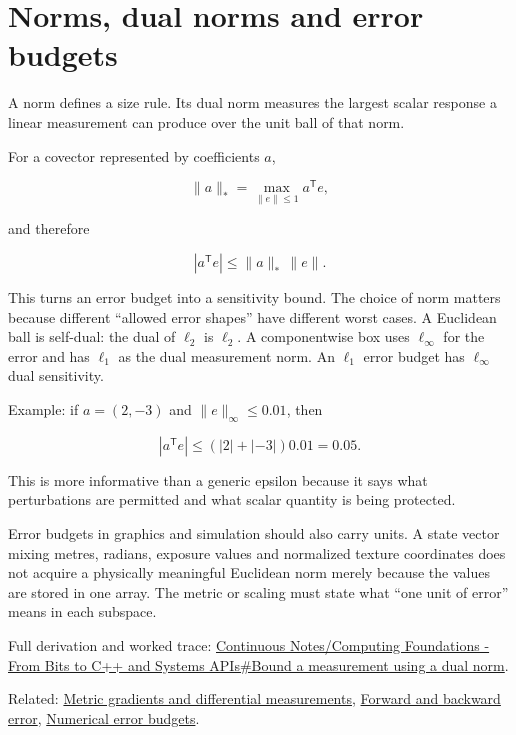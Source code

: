 \hypertarget{appendix-d6d9dbbe3c14}{}
\section{Norms, dual norms and error budgets}\label{appendix-d6d9dbbe3c14-norms-dual-norms-and-error-budgets}

A norm defines a size rule. Its dual norm measures the largest scalar response a linear measurement can produce over the unit ball of that norm.

For a covector represented by coefficients \(a\),

\[
\|a\|_* = \max_{\|e\|\le 1} a^{\mathsf T}e,
\]

and therefore

\[
|a^{\mathsf T}e|\le \|a\|_*\,\|e\|.
\]

This turns an error budget into a sensitivity bound. The choice of norm matters because different ``allowed error shapes'' have different worst cases. A Euclidean ball is self-dual: the dual of \(\ell_2\) is \(\ell_2\). A componentwise box uses \(\ell_\infty\) for the error and has \(\ell_1\) as the dual measurement norm. An \(\ell_1\) error budget has \(\ell_\infty\) dual sensitivity.

Example: if \(a=(2,-3)\) and \(\|e\|_\infty\le0.01\), then

\[
|a^{\mathsf T}e|
\le (|2|+|{-3}|)0.01
=0.05.
\]

This is more informative than a generic epsilon because it says what perturbations are permitted and what scalar quantity is being protected.

Error budgets in graphics and simulation should also carry units. A state vector mixing metres, radians, exposure values and normalized texture coordinates does not acquire a physically meaningful Euclidean norm merely because the values are stored in one array. The metric or scaling must state what ``one unit of error'' means in each subspace.

Full derivation and worked trace: \hyperref[01-foundations-i-ch017-bound-a-measurement-using-a-dual-norm]{Continuous Notes/Computing Foundations - From Bits to C++ and Systems APIs\#Bound a measurement using a dual norm}.

Related: \hyperref[appendix-f4acdb1d5563]{Metric gradients and differential measurements}, \hyperref[appendix-a7fbaf6d1b1c]{Forward and backward error}, \hyperref[appendix-31b8c295e05f]{Numerical error budgets}.

